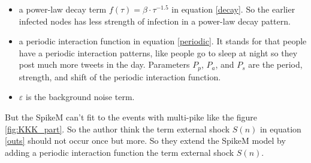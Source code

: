  \begin{itemize}
\item a power-law decay term $f(\tau)=\beta \cdot \tau ^{-1.5}
$ in equation \ref{decay}. So the earlier infected nodes has less strength of infection in a power-law decay pattern. 


\item a periodic interaction function in equation \ref{periodic}. It stands for that people have a periodic interaction patterns, like people go to sleep at night so they post much more tweets in the day. Parameters $P_p$, $P_a$, and $P_s$ are the period, strength, and shift of the periodic interaction function.
\item $\varepsilon$ is the background noise term. 
\end{itemize}
\begin{table}[!h]
 \centering
{}
\caption{Parameters of SpikeM}
\label{tab:Features_Impsortance}
\end{table}
But the SpikeM can't fit to the events with multi-pike like the figure \ref{fig:KKK_part}. So the author think the term external shock $S(n)$ in equation \ref{outs} should not occur once but more. So they extend the SpikeM model by adding a periodic interaction function the term external shock $S(n)$.

